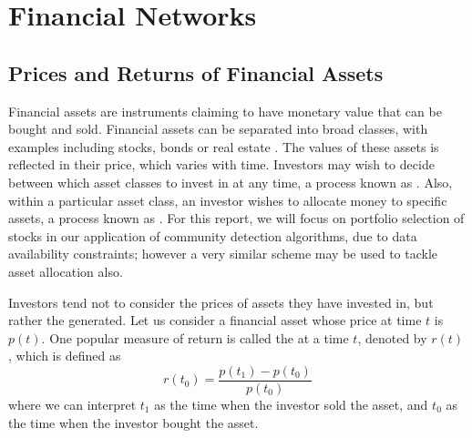 
\section{Financial Networks}
\label{sec:financialNetworksBackground}


\subsection{Prices and Returns of Financial Assets}
\label{subsec:financialAssetsBackground}

Financial assets are instruments claiming to have monetary value that can be bought and sold. Financial assets can be separated into broad classes, with examples including stocks, bonds or real estate \cite{Kuh12d,BKM13}.
The values of these assets is reflected in their price, which varies with time. Investors may wish to decide between which asset classes to invest in at any time, a process known as  \cite{BKM13}.
Also, within a particular asset class, an investor wishes to allocate money to specific assets, a process known as  \cite{BKM13}.
For this report, we will focus on portfolio selection of stocks in our application of community detection algorithms, due to data availability constraints; however a very similar scheme may be used to tackle asset allocation also.

Investors tend not to consider the prices of assets they have invested in, but rather the  generated. Let us consider a financial asset whose price at time $t$ is $p(t)$. One popular measure of return is called the  \cite{Kuh12e,BKM13} at a time $t$, denoted by $r(t)$, which is defined as
\begin{equation}
	\label{eq:rateOfReturn}
	r(t_{0}) = \frac{p(t_{1}) - p(t_{0})}{p(t_{0})}
\end{equation}
where we can interpret $t_{1}$ as the time when the investor sold the asset, and $t_{0}$ as the time when the investor bought the asset.

